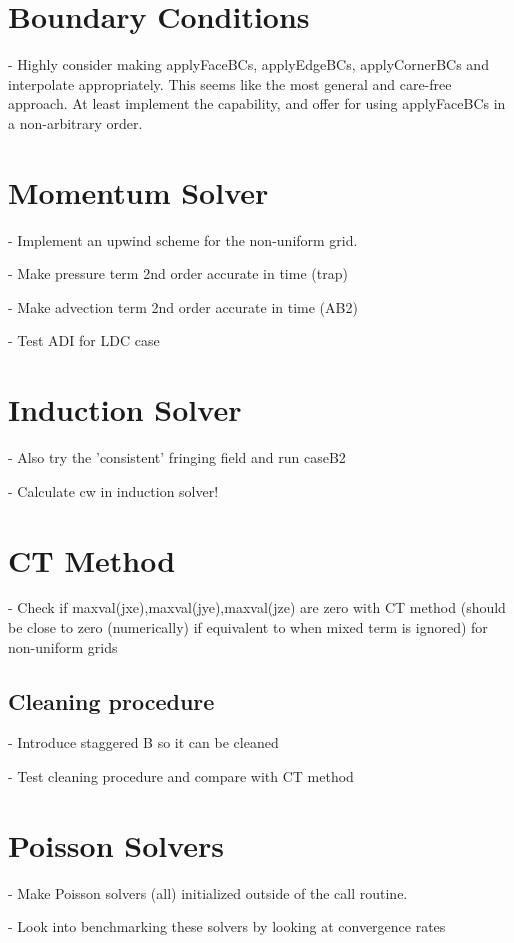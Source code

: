 \documentclass[11pt]{article}
\begin{document}
\section{Boundary Conditions}
- Highly consider making applyFaceBCs, applyEdgeBCs, applyCornerBCs and interpolate appropriately. This seems like the most general and care-free approach. At least implement the capability, and offer for using applyFaceBCs in a non-arbitrary order.

\section{Momentum Solver}

- Implement an upwind scheme for the non-uniform grid.

- Make pressure term 2nd order accurate in time (trap)

- Make advection term 2nd order accurate in time (AB2)

- Test ADI for LDC case


\section{Induction Solver}

- Also try the 'consistent' fringing field and run caseB2

- Calculate cw in induction solver!

\section{CT Method}

- Check if maxval(jxe),maxval(jye),maxval(jze) are zero with CT method (should be
  close to zero (numerically) if equivalent to when mixed term is ignored) for non-uniform grids


\subsection{Cleaning procedure}
- Introduce staggered B so it can be cleaned

- Test cleaning procedure and compare with CT method

\section{Poisson Solvers}
- Make Poisson solvers (all) initialized outside of the call routine.

- Look into benchmarking these solvers by looking at convergence rates
\end{document}
